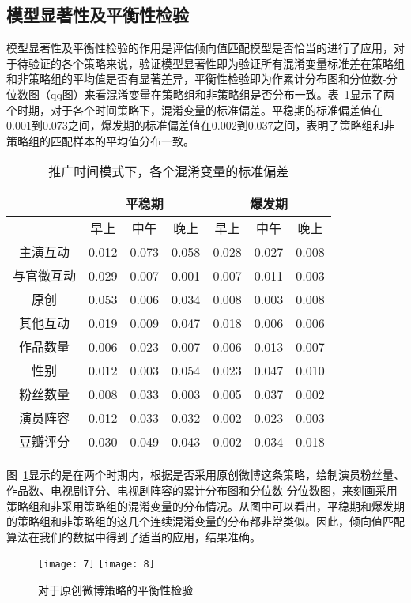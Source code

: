 \subsection{模型显著性及平衡性检验}

模型显著性及平衡性检验的作用是评估倾向值匹配模型是否恰当的进行了应用，对于待验证的各个策略来说，验证模型显著性即为验证所有混淆变量标准差在策略组和非策略组的平均值是否有显著差异，平衡性检验即为作累计分布图和分位数-分位数图（qq图）来看混淆变量在策略组和非策略组是否分布一致。表~\ref{res3}显示了两个时期，对于各个时间策略下，混淆变量的标准偏差。平稳期的标准偏差值在0.001到0.073之间，爆发期的标准偏差值在0.002到0.037之间，表明了策略组和非策略组的匹配样本的平均值分布一致。

\begin{table}[!htbp]
\centering
\caption{推广时间模式下，各个混淆变量的标准偏差}
\label{res3}
\begin{tabular}{|c|c|c|c|c|c|c|} \hline
&\multicolumn{3}{c|}{平稳期}& \multicolumn{3}{c|}{爆发期}\\ \hline
&早上&中午& 晚上 &早上&中午& 晚上\\ \hline
主演互动&0.012&0.073& 0.058&0.028&0.027& 0.008\\ \hline
与官微互动&0.029&0.007& 0.001&0.007&0.011& 0.003 \\ \hline
原创&0.053&0.006& 0.034&0.008&0.003& 0.008\\ \hline
其他互动&0.019&0.009& 0.047&0.018&0.006& 0.006\\ \hline
作品数量&0.006&0.023& 0.007&0.006&0.013& 0.007\\ \hline
性别&0.012&0.003& 0.054&0.023&0.047& 0.010\\ \hline
粉丝数量&0.008&0.033& 0.003&0.005&0.037& 0.002\\ \hline
演员阵容&0.012&0.033& 0.032&0.002&0.023& 0.003\\ \hline
豆瓣评分&0.030&0.049& 0.043&0.002&0.034&0.018\\ \hline
\end{tabular}
\end{table}

图~\ref{res2}显示的是在两个时期内，根据是否采用原创微博这条策略，绘制演员粉丝量、作品数、电视剧评分、电视剧阵容的累计分布图和分位数-分位数图，来刻画采用策略组和非采用策略组的混淆变量的分布情况。从图中可以看出，平稳期和爆发期的策略组和非策略组的这几个连续混淆变量的分布都非常类似。因此，倾向值匹配算法在我们的数据中得到了适当的应用，结果准确。

\begin{figure}[h]
  \centering%
    {\texttt{[image: 7]}}
    {\texttt{[image: 8]}}
\caption{对于原创微博策略的平衡性检验}
\label{res2}
\end{figure}

